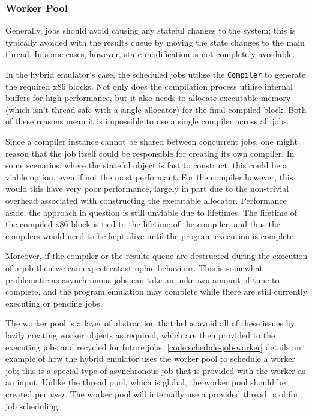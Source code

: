 \subsubsection{Worker Pool}

Generally, jobs should avoid causing any stateful changes to the system; this is typically avoided with the results queue by moving the state changes to the main thread. In some cases, however, state modification is not completely avoidable.

In the hybrid emulator's case, the scheduled jobs utilise the \texttt{Compiler} to generate the required x86 blocks. Not only does the compilation process utilise internal buffers for high performance, but it also needs to allocate executable memory (which isn't thread safe with a single allocator) for the final compiled block. Both of these reasons mean it is impossible to use a single compiler across all jobs.

Since a compiler instance cannot be shared between concurrent jobs, one might reason that the job itself could be responsible for creating its own compiler. In some scenarios, where the stateful object is fast to construct, this could be a viable option, even if not the most performant. For the compiler however, this would this have very poor performance, largely in part due to the non-trivial overhead associated with constructing the executable allocator. Performance aside, the approach in question is still unviable due to lifetimes. The lifetime of the compiled x86 block is tied to the lifetime of the compiler, and thus the compilers would need to be kept alive until the program execution is complete.

Moreover, if the compiler or the results queue are destructed during the execution of a job then we can expect catastrophic behaviour. This is somewhat problematic as asynchronous jobs can take an unknown amount of time to complete, and the program emulation may complete while there are still currently executing or pending jobs.

The worker pool is a layer of abstraction that helps avoid all of these issues by lazily creating worker objects as required, which are then provided to the executing jobs and recycled for future jobs. \autoref{code:schedule-job-worker} details an example of how the hybrid emulator uses the worker pool to schedule a worker job; this is a special type of asynchronous job that is provided with the worker as an input. Unlike the thread pool, which is global, the worker pool should be created per \textit{user}. The worker pool will internally use a provided thread pool for job scheduling.

